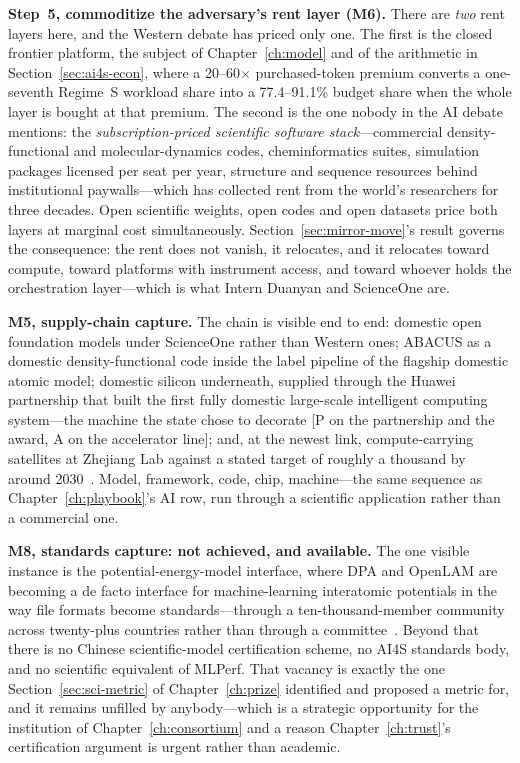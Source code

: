 \textbf{Step~5, commoditize the adversary's rent layer (M6).} There are \emph{two} rent layers here, and the Western debate has priced only one. The first is the closed frontier platform, the subject of Chapter~\ref{ch:model} and of the arithmetic in Section~\ref{sec:ai4s-econ}, where a 20--60$\times$ purchased-token premium converts a one-seventh Regime~S workload share into a 77.4--91.1\% budget share when the whole layer is bought at that premium. The second is the one nobody in the AI debate mentions: the \emph{subscription-priced scientific software stack}---commercial density-functional and molecular-dynamics codes, cheminformatics suites, simulation packages licensed per seat per year, structure and sequence resources behind institutional paywalls---which has collected rent from the world's researchers for three decades. Open scientific weights, open codes and open datasets price both layers at marginal cost simultaneously. Section~\ref{sec:mirror-move}'s result governs the consequence: the rent does not vanish, it relocates, and it relocates toward compute, toward platforms with instrument access, and toward whoever holds the orchestration layer---which is what Intern Duanyan and ScienceOne are.

\textbf{M5, supply-chain capture.} The chain is visible end to end: domestic open foundation models under ScienceOne rather than Western ones; ABACUS as a domestic density-functional code inside the label pipeline of the flagship domestic atomic model; domestic silicon underneath, supplied through the Huawei partnership that built the first fully domestic large-scale intelligent computing system---the machine the state chose to decorate [P on the partnership and the award, A on the accelerator line]; and, at the newest link, compute-carrying satellites at Zhejiang Lab against a stated target of roughly a thousand by around 2030~\cite{ai4s-institutions,deepmodeling,pengcheng-cloudbrain}. Model, framework, code, chip, machine---the same sequence as Chapter~\ref{ch:playbook}'s AI row, run through a scientific application rather than a commercial one.

\textbf{M8, standards capture: not achieved, and available.} The one visible instance is the potential-energy-model interface, where DPA and OpenLAM are becoming a de facto interface for machine-learning interatomic potentials in the way file formats become standards---through a ten-thousand-member community across twenty-plus countries rather than through a committee~\cite{deepmodeling}. Beyond that there is no Chinese scientific-model certification scheme, no AI4S standards body, and no scientific equivalent of MLPerf. That vacancy is exactly the one Section~\ref{sec:sci-metric} of Chapter~\ref{ch:prize} identified and proposed a metric for, and it remains unfilled by anybody---which is a strategic opportunity for the institution of Chapter~\ref{ch:consortium} and a reason Chapter~\ref{ch:trust}'s certification argument is urgent rather than academic.

